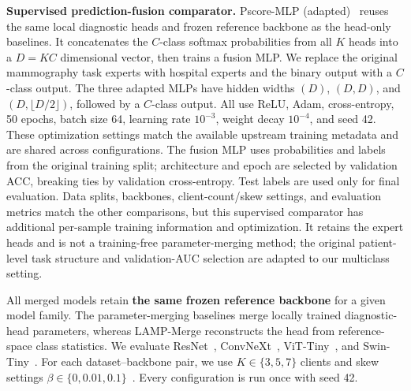 \documentclass[journal,twoside,web]{ieeecolor}
\begin{document}
\textbf{Supervised prediction-fusion comparator.} Pscore-MLP (adapted)~\cite{wimmer2022multitaskfusion} reuses the same local diagnostic heads and frozen reference backbone as the head-only baselines. It concatenates the $C$-class softmax probabilities from all $K$ heads into a $D=KC$ dimensional vector, then trains a fusion MLP. We replace the original mammography task experts with hospital experts and the binary output with a $C$-class output. The three adapted MLPs have hidden widths $(D)$, $(D,D)$, and $(D,\lfloor D/2\rfloor)$, followed by a $C$-class output. All use ReLU, Adam, cross-entropy, 50 epochs, batch size 64, learning rate $10^{-3}$, weight decay $10^{-4}$, and seed 42. These optimization settings match the available upstream training metadata and are shared across configurations. The fusion MLP uses probabilities and labels from the original training split; architecture and epoch are selected by validation ACC, breaking ties by validation cross-entropy. Test labels are used only for final evaluation. Data splits, backbones, client-count/skew settings, and evaluation metrics match the other comparisons, but this supervised comparator has additional per-sample training information and optimization. It retains the expert heads and is not a training-free parameter-merging method; the original patient-level task structure and validation-AUC selection are adapted to our multiclass setting.



All merged models retain \textbf{the same frozen reference backbone} for a given model family. The parameter-merging baselines merge locally trained diagnostic-head parameters, whereas LAMP-Merge reconstructs the head from reference-space class statistics. We evaluate ResNet~\cite{he2016deep}, ConvNeXt~\cite{liu2022convnet}, ViT-Tiny~\cite{dosovitskiy2021image}, and Swin-Tiny~\cite{liu2021swin}. For each dataset--backbone pair, we use $K\in\{3,5,7\}$ clients and skew settings $\beta\in\{0,0.01,0.1\}$~\cite{hsu2019measuringeffectsnonidenticaldata}. Every configuration is run once with seed 42.
\end{document}
